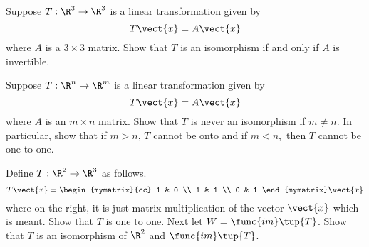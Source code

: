 \begin{enumialphparenastyle}
\begin{ex} Suppose $T:\R^{3}\rightarrow \R^{3}$ is a linear
transformation given by 
\begin{equation*}
T\vect{x}=A\vect{x}
\end{equation*}
where $A$ is a $3\times 3$ matrix. Show that $T$ is an isomorphism if and
only if $A$ is invertible.
\end{ex}


\begin{ex} Suppose $T:\R^{n}\rightarrow \R^{m}$ is a linear
transformation given by 
\begin{equation*}
T\vect{x}=A\vect{x}
\end{equation*}
where $A$ is an $m\times n$ matrix. Show that $T$ is never an isomorphism if 
$m\neq n$. In particular, show that if $m>n$, $T$ cannot be onto and if $
m<n, $ then $T$ cannot be one to one.
\end{ex}


\begin{ex} Define $T:\R^{2}\rightarrow \R^{3}$ as follows. 
\begin{equation*}
T\vect{x}=\begin{mymatrix}{cc}
1 & 0 \\ 
1 & 1 \\ 
0 & 1
\end{mymatrix} \vect{x}
\end{equation*}
where on the right, it is just matrix multiplication of the vector $\vect{x}$
which is meant. Show that $T$ is one to one. Next let $W=\func{im}\tup{
T}$. Show that $T$ is an isomorphism of $\R^{2}$ and $\func{im
}\tup{T}$.
\end{ex}



\end{enumialphparenastyle}
